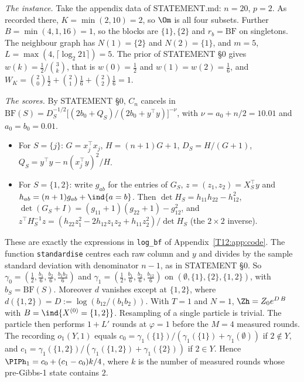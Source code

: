 \documentclass[11pt]{report}
\begin{document}
\emph{The instance.} Take the appendix data of STATEMENT.md: $n=20$, $p=2$. As recorded there, $K=\min(2,10)=2$, so $\Om$ is all four subsets. Further $B=\min(4,1,16)=1$, so the blocks are $\{1\},\{2\}$ and $r_b=\mathrm{BF}$ on singletons. The neighbour graph has $N(1)=\{2\}$ and $N(2)=\{1\}$, and $m=5$, $L=\max(4,\lceil\log_2 21\rceil)=5$. The prior of STATEMENT \S0 gives $w(k)=\tfrac12/\binom{3}{k}$, that is $w(0)=\frac12$ and $w(1)=w(2)=\frac16$, and $W_K=\binom20\frac12+\binom21\frac16+\binom22\frac16=1$.

\emph{The scores.} By STATEMENT \S0, $C_n$ cancels in $\mathrm{BF}(S)=D_S^{-1/2}\big[(2b_0+Q_S)/(2b_0+y^\top y)\big]^{-\nu}$, with $\nu=a_0+n/2=10.01$ and $a_0=b_0=0.01$.
\begin{itemize}
\item For $S=\{j\}$: $G=x_j^\top x_j$, $H=(n+1)G+1$, $D_S=H/(G+1)$, $Q_S=y^\top y-n(x_j^\top y)^2/H$.
\item For $S=\{1,2\}$: write $g_{ab}$ for the entries of $G_S$, $z=(z_1,z_2)=X_S^\top y$ and $h_{ab}=(n+1)g_{ab}+\ind\{a=b\}$. Then $\det H_S=h_{11}h_{22}-h_{12}^2$, $\det(G_S+I)=(g_{11}+1)(g_{22}+1)-g_{12}^2$, and $z^\top H_S^{-1}z=(h_{22}z_1^2-2h_{12}z_1z_2+h_{11}z_2^2)/\det H_S$ (the $2\times2$ inverse).
\end{itemize}
These are exactly the expressions in \texttt{log\_bf} of Appendix~\ref{T12:app:code}. The function \texttt{standardise} centres each raw column and $y$ and divides by the sample standard deviation with denominator $n-1$, as in STATEMENT \S0. So $\gamma_0=(\frac12,\frac{b_1}6,\frac{b_2}6,\frac{b_1b_2}6)$ and $\gamma_1=(\frac12,\frac{b_1}6,\frac{b_2}6,\frac{b_{12}}6)$ on $(\emptyset,\{1\},\{2\},\{1,2\})$, with $b_S=\mathrm{BF}(S)$. Moreover $d$ vanishes except at $\{1,2\}$, where $d(\{1,2\})=D:=\log(b_{12}/(b_1b_2))$. With $T=1$ and $N=1$, $\Zh=Z_0e^{D\,B}$ with $B=\ind\{X^{(0)}=\{1,2\}\}$. Resampling of a single particle is trivial. The particle then performs $1+L'$ rounds at $\varphi=1$ before the $M=4$ measured rounds. The recording $o_1(Y,1)$ equals $c_0=\gamma_1(\{1\})/(\gamma_1(\{1\})+\gamma_1(\emptyset))$ if $2\notin Y$, and $c_1=\gamma_1(\{1,2\})/(\gamma_1(\{1,2\})+\gamma_1(\{2\}))$ if $2\in Y$. Hence $\PIPh_1=c_0+(c_1-c_0)k/4$, where $k$ is the number of measured rounds whose pre-Gibbs-1 state contains $2$.
\end{document}
